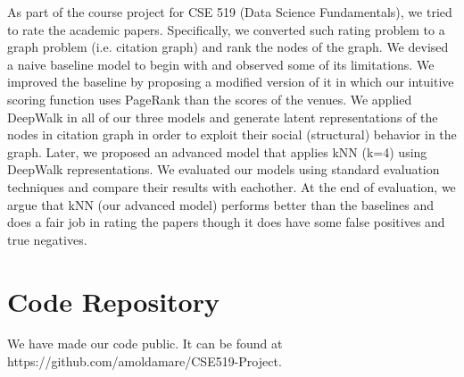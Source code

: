 \documentclass[a4paper, 11pt]{article}
\begin{document}
As part of the course project for CSE 519 (Data Science Fundamentals), we tried to rate the academic papers. Specifically, we converted such rating problem to a graph problem (i.e. citation graph) and  rank the nodes of the graph. We devised a naive baseline model to begin with and observed some of its limitations. We improved the baseline by proposing a modified version of it in which our intuitive scoring function uses PageRank than the scores of the venues. We applied DeepWalk in all of our three models and generate latent representations of the nodes in citation graph in order to exploit their social (structural) behavior in the graph. Later, we proposed an advanced model that applies kNN (k=4) using DeepWalk representations. We evaluated our models using standard evaluation techniques and compare their results with eachother. At the end of evaluation, we argue that kNN (our advanced model) performs better than the baselines and does a fair job in rating the papers though it does have some false positives and true negatives.

\section{Code Repository}

We have made our code public. It can be found at https://github.com/amoldamare/CSE519-Project. 

\end{document}
